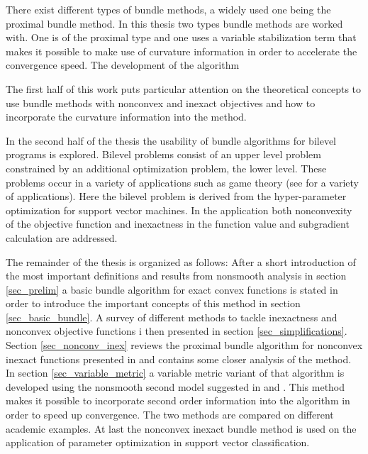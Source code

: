 There exist different types of bundle methods, a widely used one being the proximal bundle method.
In this thesis two types bundle methods are worked with. One is of the proximal type and one uses a variable stabilization term that makes it possible to make use of curvature information in order to accelerate the convergence speed.
The development of the algorithm 

The first half of this work puts particular attention on the theoretical concepts to use bundle methods with nonconvex and inexact objectives and how to incorporate the curvature information into the method.

In the second half of the thesis the usability of bundle algorithms for bilevel programs is explored. Bilevel problems consist of an upper level problem constrained by an additional optimization problem, the lower level.
These problems occur in a variety of applications such as game theory (see \cite[section 2.1]{Colson2007} for a variety of applications).
Here the bilevel problem is derived from the hyper-parameter optimization for support vector machines. 
In the application both nonconvexity of the objective function and inexactness in the function value and subgradient calculation are addressed.

The remainder of the thesis is organized as follows:
After a short introduction of the most important definitions and results from nonsmooth analysis in section \ref{sec_prelim} a basic bundle algorithm for exact convex functions is stated in order to introduce the important concepts of this method in section \ref{sec_basic_bundle}. A survey of different methods to tackle inexactness and nonconvex objective functions i then presented in section \ref{sec_simplifications}.
Section \ref{sec_nonconv_inex} reviews the proximal bundle algorithm for nonconvex inexact functions presented in \cite{Hare2016} and contains some closer analysis of the method. In section \ref{sec_variable_metric} a variable metric variant of that algorithm is developed using the nonsmooth second model suggested in \cite{Noll2012} and \cite{Noll2013}.
This method makes it possible to incorporate second order information into the algorithm in order to speed up convergence.
The two methods are compared on different academic examples.
At last the nonconvex inexact bundle method is used on the application of parameter optimization in support vector classification.  

 


